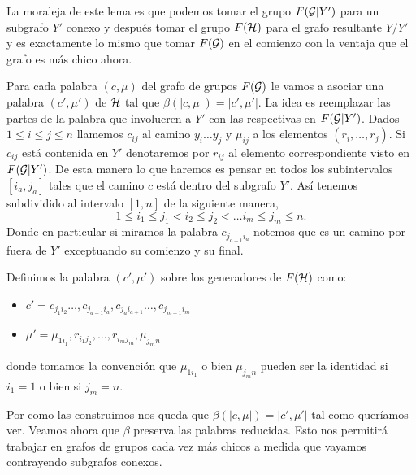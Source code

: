\documentclass[tesis.tex]{subfiles}
\begin{document}
La moraleja de este lema es que podemos tomar el grupo $F({\cal G} | Y')$ para un subgrafo $Y'$ conexo y después tomar el grupo $F({\cal H})$ para el grafo resultante $Y / Y'$ y es exactamente lo mismo que tomar $F({\cal G})$ en el comienzo con la ventaja que el grafo es más chico ahora.

Para cada palabra $(c, \mu)$ del grafo de grupos $F({\cal G})$ le vamos a asociar una palabra $(c', \mu')$ de ${\cal H}$ tal que $\beta (|c,\mu|) = |c',\mu'|$.
La idea es reemplazar las partes de la palabra que involucren a $Y'$ con las respectivas en $F({\cal G} | Y')$.
Dados $ 1 \le i \le j \le n$ llamemos $c_{ij}$ al camino $y_i \dots y_{j}$ y $\mu_{ij}$ a los elementos $(r_i, \dots, r_j)$.
Si $c_{ij}$ está contenida en $Y'$ denotaremos por $r_{ij}$ al elemento correspondiente visto en $F({\cal G} | Y')$.
De esta manera lo que haremos es pensar en todos los subintervalos $[i_a,j_a]$ tales que el camino $c$ está dentro del subgrafo $Y'$.
Así tenemos subdividido al intervalo $[1,n]$ de la siguiente manera,
\[
	1\le i_1 \le j_1 < i_2 \le j_2 < \dots i_m \le j_m \le n.
\]
Donde en particular si miramos la palabra $c_{j_{a-1}i_a}$ notemos que es un camino por fuera de $Y'$ exceptuando su comienzo y su final.

Definimos la palabra $(c', \mu')$ sobre los generadores de $F({\cal H})$ como:
\begin{itemize}
	\item $c' = c_{j_1i_2} \dots, c_{j_{a-1}i_a},c_{j_{a}i_{a+1}} \dots, c_{j_{m-1}i_{m}}$
	\item $\mu' = \mu_{1i_1}, r_{i_1j_2}, \dots, r_{i_mj_m}, \mu_{j_m n}   $
\end{itemize}
donde tomamos la convención que $\mu_{1i_1}$ o bien $\mu_{j_m n}$ pueden ser la identidad si $i_1=1$ o bien si $j_m = n$.




Por como las construimos nos queda que $\beta(|c,\mu|) = |c',\mu'|$ tal como queríamos ver.
Veamos ahora que $\beta$ preserva las palabras reducidas. 
Esto nos permitirá trabajar en grafos de grupos cada vez más chicos a medida que vayamos contrayendo subgrafos conexos.
\end{document}
